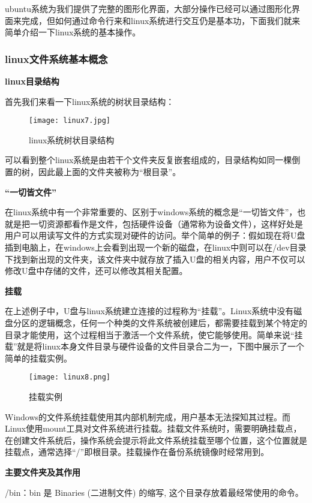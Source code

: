 ubuntu系统为我们提供了完整的图形化界面，大部分操作已经可以通过图形化界面来完成，但如何通过命令行来和linux系统进行交互仍是基本功，下面我们就来简单介绍一下linux系统的基本操作。
\subsubsection{linux文件系统基本概念}
\textbf{linux目录结构}

首先我们来看一下linux系统的树状目录结构：

\begin{figure}[H]
    \centering
    \texttt{[image: linux7.jpg]}
    \caption{linux系统树状目录结构} %
    \label{fig:linux7} %
\end{figure}

可以看到整个linux系统是由若干个文件夹反复嵌套组成的，目录结构如同一棵倒置的树，因此最上面的文件夹被称为“根目录”。

\textbf{“一切皆文件”}

在linux系统中有一个非常重要的、区别于windows系统的概念是“一切皆文件”，也就是把一切资源都看作是文件，包括硬件设备（通常称为设备文件），这样好处是用户可以用读写文件的方式实现对硬件的访问。举个简单的例子：假如现在将U盘插到电脑上，在windows上会看到出现一个新的磁盘，在linux中则可以在/dev目录下找到新出现的文件夹，该文件夹中就存放了插入U盘的相关内容，用户不仅可以修改U盘中存储的文件，还可以修改其相关配置。

\textbf{挂载}

在上述例子中，U盘与linux系统建立连接的过程称为“挂载”。Linux系统中没有磁盘分区的逻辑概念，任何一个种类的文件系统被创建后，都需要挂载到某个特定的目录才能使用，这个过程相当于激活一个文件系统，使它能够使用。简单来说“挂载”就是将linux本身文件目录与硬件设备的文件目录合二为一，下图中展示了一个简单的挂载实例。

\begin{figure}[H]
    \centering
    \texttt{[image: linux8.png]}
    \caption{挂载实例} %
    \label{fig:linux8} %
\end{figure}

Windows的文件系统挂载使用其内部机制完成，用户基本无法探知其过程。而Linux使用mount工具对文件系统进行挂载。挂载文件系统时，需要明确挂载点，在创建文件系统后，操作系统会提示将此文件系统挂载至哪个位置，这个位置就是挂载点，通常选择“/”即根目录。挂载操作在备份系统镜像时经常用到。

\textbf{主要文件夹及其作用}

/bin：bin 是 Binaries (二进制文件) 的缩写, 这个目录存放着最经常使用的命令。

